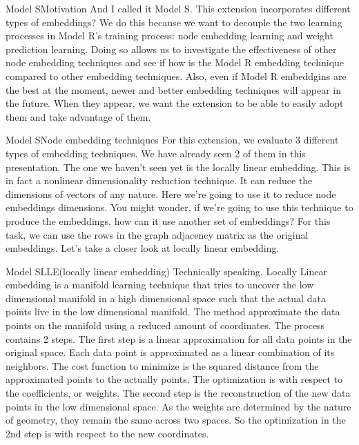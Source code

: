 \documentclass{beamer}
\begin{document}
\begin{frame}{Model S}{Motivation}
And I called it Model S. This extension incorporates different types of embeddings? We do this because we want to decouple the two learning processes in Model R's training process: node embedding learning and weight prediction learning. Doing so allows us to investigate the effectiveness of other node embedding techniques and see if how is the Model R embedding technique compared to other embedding techniques. Also, even if Model R embeddgins are the best at the moment, newer and better embedding techniques will appear in the future. When they appear, we want the extension to be able to easily adopt them and take advantage of them.
\end{frame}

\begin{frame}{Model S}{Node embedding techniques}
For this extension, we evaluate 3 different types of embedding techniques. We have already seen 2 of them in this presentation. The one we haven't seen yet is the locally linear embedding. This is in fact a nonlinear dimensionality reduction technique. It can reduce the dimensions of vectors of any nature. Here we're going to use it to reduce node embeddings dimensions. You might wonder, if we're going to use this technique to produce the embeddings, how can it use another set of embeddings? For this task, we can use the rows in the graph adjacency matrix as the original embeddings. Let's take a closer look at locally linear embedding.
\end{frame}

\begin{frame}{Model S}{LLE(locally linear embedding)}
Technically speaking, Locally Linear embedding is a manifold learning technique that tries to uncover the low dimensional manifold in a high dimensional space such that the actual data points live in the low dimensional manifold. The method approximate the data points on the manifold using a reduced amount of coordinates. The process contains 2 steps. The first step is a linear approximation for all data points in the original space. Each data point is approximated as a linear combination of its neighbors. The cost function to minimize is the squared distance from the approximated points to the actually points. The optimization is with respect to the coefficients, or weights. The second step is the reconstruction of the new data points in the low dimensional space. As the weights are determined by the nature of geometry, they remain the same across two spaces. So the optimization in the 2nd step is with respect to the new coordinates.
\end{frame}
\end{document}
